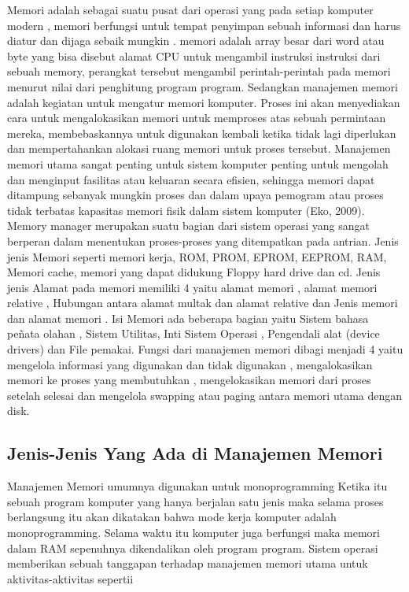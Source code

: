Memori adalah sebagai suatu pusat dari operasi yang pada setiap komputer modern , memori berfungsi untuk tempat penyimpan sebuah informasi dan harus diatur dan dijaga sebaik mungkin . memori adalah array besar dari word atau byte yang bisa disebut alamat CPU untuk mengambil instruksi instruksi dari sebuah memory, perangkat tersebut mengambil perintah-perintah pada memori menurut nilai dari penghitung program  program.
Sedangkan manajemen memori adalah kegiatan untuk mengatur memori komputer. Proses ini akan menyediakan cara untuk mengalokasikan memori untuk memproses atas sebuah  permintaan mereka, membebaskannya untuk digunakan kembali ketika tidak lagi diperlukan dan mempertahankan alokasi ruang memori untuk proses tersebut. Manajemen memori utama sangat penting untuk sistem komputer  penting untuk mengolah dan menginput fasilitas atau keluaran secara efisien, sehingga memori dapat ditampung sebanyak mungkin proses dan dalam upaya pemogram atau proses tidak terbatas kapasitas memori fisik dalam sistem komputer (Eko, 2009).
Memory manager merupakan suatu bagian dari sistem operasi yang sangat berperan dalam menentukan proses-proses yang ditempatkan pada antrian.
Jenis jenis Memori seperti memori kerja, ROM, PROM, EPROM, EEPROM, RAM, Memori cache, memori yang dapat didukung Floppy hard drive dan cd.
Jenis jenis Alamat pada memori memiliki 4 yaitu alamat memori , alamat memori relative , Hubungan antara alamat multak dan alamat relative dan Jenis memori dan alamat memori .
Isi Memori ada beberapa bagian yaitu Sistem bahasa peñata olahan , Sistem Utilitas, Inti Sistem Operasi , Pengendali alat (device drivers) dan File pemakai.
Fungsi dari manajemen memori dibagi menjadi 4 yaitu mengelola informasi yang digunakan dan tidak digunakan , mengalokasikan memori ke proses yang membutuhkan , mengelokasikan memori dari proses setelah selesai dan mengelola swapping atau paging antara memori utama dengan disk. 

\subsection {Jenis-Jenis Yang Ada di Manajemen Memori}
Manajemen Memori umumnya digunakan untuk monoprogramming
Ketika itu sebuah program komputer yang hanya berjalan satu jenis maka selama proses berlangsung itu akan dikatakan bahwa mode kerja komputer adalah monoprogramming. Selama waktu itu komputer juga berfungsi maka memori dalam RAM sepenuhnya dikendalikan oleh program program.
Sistem operasi memberikan sebuah  tanggapan terhadap manajemen memori utama untuk aktivitas-aktivitas sepertii 

